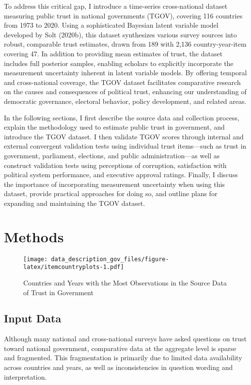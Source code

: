 \documentclass[
  12pt,
]{article}
\begin{document}
To address this critical gap, I introduce a time-series cross-national dataset measuring public trust in national governments (TGOV), covering 116 countries from 1973 to 2020.
Using a sophisticated Bayesian latent variable model developed by Solt (2020b), this dataset synthesizes various survey sources into robust, comparable trust estimates, drawn from 189 with 2,136 country-year-item covering 47.
In addition to providing mean estimates of trust, the dataset includes full posterior samples, enabling scholars to explicitly incorporate the measurement uncertainty inherent in latent variable models.
By offering temporal and cross-national coverage, the TGOV dataset facilitates comparative research on the causes and consequences of political trust, enhancing our understanding of democratic governance, electoral behavior, policy development, and related areas.

In the following sections, I first describe the source data and collection process, explain the methodology used to estimate public trust in government, and introduce the TGOV dataset.
I then validate TGOV scores through internal and external convergent validation tests using individual trust items---such as trust in government, parliament, elections, and public administration---as well as construct validation tests using perceptions of corruption, satisfaction with political system performance, and executive approval ratings.
Finally, I discuss the importance of incorporating measurement uncertainty when using this dataset, provide practical approaches for doing so, and outline plans for expanding and maintaining the TGOV dataset.

\section{Methods}\label{methods}

\begin{figure}
\centering
\texttt{[image: data\_description\_gov\_files/figure-latex/itemcountryplots-1.pdf]}
\caption{\label{fig:itemcountryplots}Countries and Years with the Most Observations in the Source Data of Trust in Government \label{tgov_item_country_plots}}
\end{figure}

\subsection{Input Data}\label{input-data}

Although many national and cross-national surveys have asked questions on trust toward national government, comparative data at the aggregate level is sparse and fragmented.
This fragmentation is primarily due to limited data availability across countries and years, as well as inconsistencies in question wording and interpretation.
\end{document}
